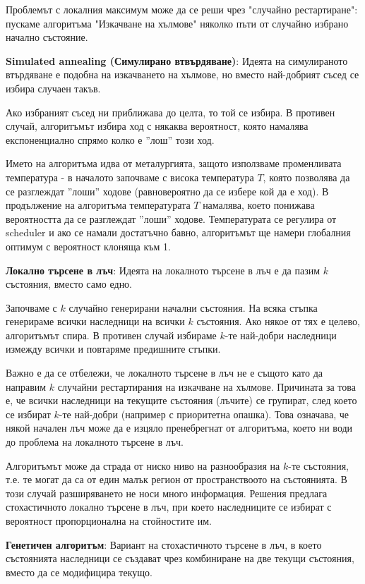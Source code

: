 \documentclass{article}
\renewcommand{\\}{\newline}
\begin{document}
Проблемът с локалния максимум може да се реши чрез "случайно рестартиране": пускаме алгоритъма "Изкачване на хълмове" няколко пъти от случайно избрано начално състояние.  

\textbf{Simulated annealing (Симулирано втвърдяване)}: Идеята на симулираното втърдяване е подобна на изкачването на хълмове, но вместо най-добрият съсед се избира случаен такъв. 

Ако избраният съсед ни приближава до целта, то той се избира. В противен случай, алгоритъмът избира ход с някаква вероятност, която намалява експоненциално спрямо колко е ''лош'' този ход. 

Името на алгоритъма идва от металургията, защото използваме променливата температура - в началото започваме с висока температура \(T\), която позволява да се разглеждат ''лоши'' ходове (равновероятно да се избере кой да е ход). В продължение на алгоритъма температурата \(T\) намалява, което понижава вероятността да се разглеждат ''лоши'' ходове. Температурата се регулира от scheduler и ако се намали достатъчно бавно, алгоритъмът ще намери глобалния оптимум с вероятност клоняща към 1.

\textbf{Локално търсене в лъч}: Идеята на локалното търсене в лъч е да пазим \(k\) състояния, вместо само едно. 

Започваме с \(k\) случайно генерирани начални състояния. На всяка стъпка генерираме всички наследници на всички \(k\) състояния. Ако някое от тях е целево, алгоритъмът спира. В противен случай избираме \(k\)-те най-добри наследници измежду всички и повтаряме предишните стъпки. 

Важно е да се отбележи, че локалното търсене в лъч не е същото като да направим \(k\) случайни рестартирания на изкачване на хълмове. Причината за това е, че всички наследници на текущите състояния (лъчите) се групират, след което се избират \(k\)-те най-добри (например с приоритетна опашка). Това означава, че някой начален лъч може да е изцяло пренебрегнат от алгоритъма, което ни води до проблема на локалното търсене в лъч.

Алгоритъмът може да страда от ниско ниво на разнообразия на \(k\)-те състояния, т.е. те могат да са от един малък регион от пространствоото на състоянията. В този случай разширяването не носи много информация. Решения предлага стохастичното локално търсене в лъч, при което наследниците се избират с вероятност пропорционална на стойностите им. 

\textbf{Генетичен алгоритъм}: Вариант на стохастичното търсене в лъч, в което състоянията наследници се създават чрез комбиниране на две текущи състояния, вместо да се модифицира текущо. 
\end{document}
